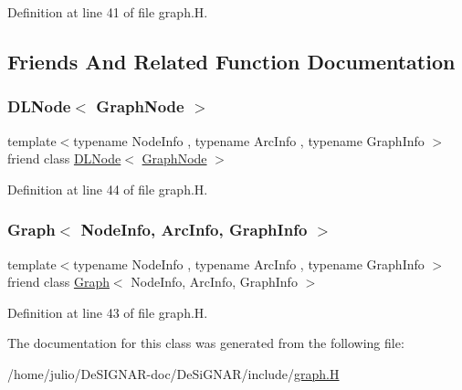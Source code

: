 Definition at line 41 of file graph.\+H.



\subsection{Friends And Related Function Documentation}
\mbox{\label{class_designar_1_1_graph_node_a5d0e7b51039a0eb5cfdfdb2f3701f06d}} 
\subsubsection{\texorpdfstring{D\+L\+Node$<$ Graph\+Node $>$}{DLNode< GraphNode >}}
{\footnotesize\ttfamily template$<$typename Node\+Info , typename Arc\+Info , typename Graph\+Info $>$ \\
friend class \hyperlink{class_designar_1_1_d_l_node}{D\+L\+Node}$<$ \hyperlink{class_designar_1_1_graph_node}{Graph\+Node} $>$\hspace{0.3cm}{\ttfamily [friend]}}



Definition at line 44 of file graph.\+H.

\mbox{\label{class_designar_1_1_graph_node_a0a9834688687d864501bbb9c85b0d32c}} 
\subsubsection{\texorpdfstring{Graph$<$ Node\+Info, Arc\+Info, Graph\+Info $>$}{Graph< NodeInfo, ArcInfo, GraphInfo >}}
{\footnotesize\ttfamily template$<$typename Node\+Info , typename Arc\+Info , typename Graph\+Info $>$ \\
friend class \hyperlink{class_designar_1_1_graph}{Graph}$<$ Node\+Info, Arc\+Info, Graph\+Info $>$\hspace{0.3cm}{\ttfamily [friend]}}



Definition at line 43 of file graph.\+H.



The documentation for this class was generated from the following file\+:\begin{DoxyCompactItemize}
\item 
/home/julio/\+De\+S\+I\+G\+N\+A\+R-\/doc/\+De\+Si\+G\+N\+A\+R/include/\hyperlink{graph_8_h}{graph.\+H}\end{DoxyCompactItemize}
